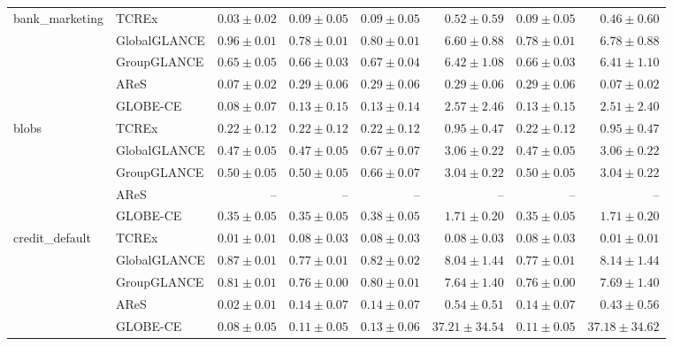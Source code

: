 \begin{table}[ht]
\begin{center}
\begin{sc}
\begin{scriptsize}
\begin{tabular}{l|l|rrrrrr}
\midrule
\multirow{5}{*}{bank\_marketing} & TCREx & $\boldsymbol{0.03\pm{0.02}}$ & $\boldsymbol{0.09\pm{0.05}}$ & $\boldsymbol{0.09\pm{0.05}}$ & $0.52\pm{0.59}$ & $\boldsymbol{0.09\pm{0.05}}$ & $0.46\pm{0.60}$ \\
 & GlobalGLANCE & $0.96\pm{0.01}$ & $0.78\pm{0.01}$ & $0.80\pm{0.01}$ & $6.60\pm{0.88}$ & $0.78\pm{0.01}$ & $6.78\pm{0.88}$ \\
 & GroupGLANCE & $0.65\pm{0.05}$ & $0.66\pm{0.03}$ & $0.67\pm{0.04}$ & $6.42\pm{1.08}$ & $0.66\pm{0.03}$ & $6.41\pm{1.10}$ \\
 & AReS & $0.07\pm{0.02}$ & $0.29\pm{0.06}$ & $0.29\pm{0.06}$ & $\boldsymbol{0.29\pm{0.06}}$ & $0.29\pm{0.06}$ & $\boldsymbol{0.07\pm{0.02}}$ \\
 & GLOBE-CE & $0.08\pm{0.07}$ & $0.13\pm{0.15}$ & $0.13\pm{0.14}$ & $2.57\pm{2.46}$ & $0.13\pm{0.15}$ & $2.51\pm{2.40}$ \\
\midrule
\multirow{5}{*}{blobs} & TCREx & $\boldsymbol{0.22\pm{0.12}}$ & $\boldsymbol{0.22\pm{0.12}}$ & $\boldsymbol{0.22\pm{0.12}}$ & $\boldsymbol{0.95\pm{0.47}}$ & $\boldsymbol{0.22\pm{0.12}}$ & $\boldsymbol{0.95\pm{0.47}}$ \\
 & GlobalGLANCE & $0.47\pm{0.05}$ & $0.47\pm{0.05}$ & $0.67\pm{0.07}$ & $3.06\pm{0.22}$ & $0.47\pm{0.05}$ & $3.06\pm{0.22}$ \\
 & GroupGLANCE & $0.50\pm{0.05}$ & $0.50\pm{0.05}$ & $0.66\pm{0.07}$ & $3.04\pm{0.22}$ & $0.50\pm{0.05}$ & $3.04\pm{0.22}$ \\
 & AReS & -- & -- & -- & -- & -- & -- \\
 & GLOBE-CE & $0.35\pm{0.05}$ & $0.35\pm{0.05}$ & $0.38\pm{0.05}$ & $1.71\pm{0.20}$ & $0.35\pm{0.05}$ & $1.71\pm{0.20}$ \\
\midrule
\multirow{5}{*}{credit\_default} & TCREx & $\boldsymbol{0.01\pm{0.01}}$ & $\boldsymbol{0.08\pm{0.03}}$ & $\boldsymbol{0.08\pm{0.03}}$ & $\boldsymbol{0.08\pm{0.03}}$ & $\boldsymbol{0.08\pm{0.03}}$ & $\boldsymbol{0.01\pm{0.01}}$ \\
 & GlobalGLANCE & $0.87\pm{0.01}$ & $0.77\pm{0.01}$ & $0.82\pm{0.02}$ & $8.04\pm{1.44}$ & $0.77\pm{0.01}$ & $8.14\pm{1.44}$ \\
 & GroupGLANCE & $0.81\pm{0.01}$ & $0.76\pm{0.00}$ & $0.80\pm{0.01}$ & $7.64\pm{1.40}$ & $0.76\pm{0.00}$ & $7.69\pm{1.40}$ \\
 & AReS & $0.02\pm{0.01}$ & $0.14\pm{0.07}$ & $0.14\pm{0.07}$ & $0.54\pm{0.51}$ & $0.14\pm{0.07}$ & $0.43\pm{0.56}$ \\
 & GLOBE-CE & $0.08\pm{0.05}$ & $0.11\pm{0.05}$ & $0.13\pm{0.06}$ & $37.21\pm{34.54}$ & $0.11\pm{0.05}$ & $37.18\pm{34.62}$ \\

\end{tabular}
\end{scriptsize}
\end{sc}
\end{center}
\end{table}
